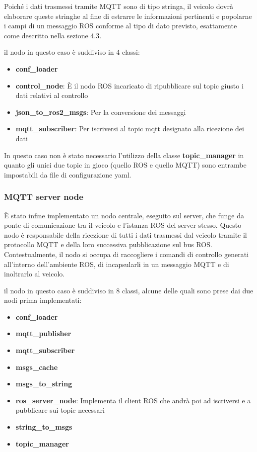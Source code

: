 \noindent Poiché i dati trasmessi tramite MQTT sono di tipo stringa, il veicolo dovrà elaborare queste stringhe al fine di estrarre le informazioni pertinenti e popolarne i campi di un messaggio ROS conforme al tipo di dato previsto, esattamente come descritto nella sezione 4.3.

\noindent il nodo in questo caso è suddiviso in 4 classi: 

\begin{itemize}
  \item \textbf{conf\_loader}
  \item \textbf{control\_node}: È il nodo ROS incaricato di ripubblicare sul topic giusto i dati relativi al controllo
  \item \textbf{json\_to\_ros2\_msgs}: Per la conversione dei messaggi
  \item \textbf{mqtt\_subscriber}: Per iscriversi al topic mqtt designato alla ricezione dei dati
\end{itemize}

\noindent In questo caso non è stato necessario l'utilizzo della classe \textbf{topic\_manager} in quanto gli unici due topic in gioco (quello ROS e quello MQTT) sono entrambe impostabili da file di configurazione yaml.

\subsubsection{MQTT server node}
È stato infine implementato un nodo centrale, eseguito sul server, che funge da ponte di comunicazione tra il veicolo e l'istanza ROS del server stesso. Questo nodo è responsabile della ricezione di tutti i dati trasmessi dal veicolo tramite il protocollo MQTT e della loro successiva pubblicazione sul bus ROS. Contestualmente, il nodo si occupa di raccogliere i comandi di controllo generati all'interno dell'ambiente ROS, di incapsularli in un messaggio MQTT e di inoltrarlo al veicolo.

\noindent il nodo in questo caso è suddiviso in 8 classi, alcune delle quali sono prese dai due nodi prima implementati:

\begin{itemize}
  \item \textbf{conf\_loader}
  \item \textbf{mqtt\_publisher}
  \item \textbf{mqtt\_subscriber}
  \item \textbf{msgs\_cache}
  \item \textbf{msgs\_to\_string}
  \item \textbf{ros\_server\_node}: Implementa il client ROS che andrà poi ad iscriversi e a pubblicare sui topic necessari
  \item \textbf{string\_to\_msgs}
  \item \textbf{topic\_manager}
\end{itemize}
